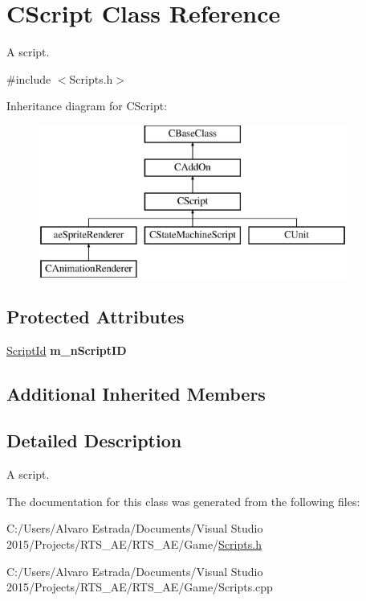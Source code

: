 \hypertarget{class_c_script}{}\section{C\+Script Class Reference}
\label{class_c_script}


A script.  




{\ttfamily \#include $<$Scripts.\+h$>$}

Inheritance diagram for C\+Script\+:\begin{figure}[H]
\begin{center}
\leavevmode
\includegraphics[height=5.000000cm]{class_c_script}
\end{center}
\end{figure}
\subsection*{Protected Attributes}
\begin{DoxyCompactItemize}
\item 
\hyperlink{_scripts_8h_a5d3f231722ed23af7cf63216ade194f4}{Script\+Id} {\bfseries m\+\_\+n\+Script\+ID}\hypertarget{class_c_script_a4d424a0fcb602bff84027501b7494348}{}\label{class_c_script_a4d424a0fcb602bff84027501b7494348}

\end{DoxyCompactItemize}
\subsection*{Additional Inherited Members}


\subsection{Detailed Description}
A script. 

The documentation for this class was generated from the following files\+:\begin{DoxyCompactItemize}
\item 
C\+:/\+Users/\+Alvaro Estrada/\+Documents/\+Visual Studio 2015/\+Projects/\+R\+T\+S\+\_\+\+A\+E/\+R\+T\+S\+\_\+\+A\+E/\+Game/\hyperlink{_scripts_8h}{Scripts.\+h}\item 
C\+:/\+Users/\+Alvaro Estrada/\+Documents/\+Visual Studio 2015/\+Projects/\+R\+T\+S\+\_\+\+A\+E/\+R\+T\+S\+\_\+\+A\+E/\+Game/Scripts.\+cpp\end{DoxyCompactItemize}
